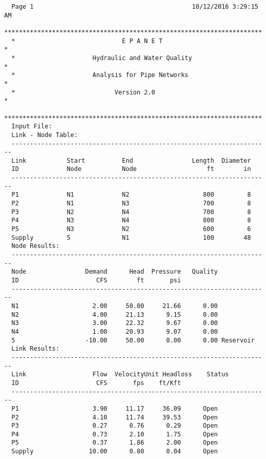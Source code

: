 \documentclass[12pt]{article}
\begin{document}
\begin{verbatim}
  Page 1                                           10/12/2016 3:29:15 AM
  **********************************************************************
  *                             E P A N E T                            *
  *                     Hydraulic and Water Quality                    *
  *                     Analysis for Pipe Networks                     *
  *                           Version 2.0                              *
  **********************************************************************
  Input File: 
  Link - Node Table:
  ----------------------------------------------------------------------
  Link           Start          End                Length  Diameter
  ID             Node           Node                   ft        in
  ----------------------------------------------------------------------
  P1             N1             N2                    800         8
  P2             N1             N3                    700         8
  P3             N2             N4                    700         8
  P4             N3             N4                    800         8
  P5             N3             N2                    600         6
  Supply         5              N1                    100        48
  Node Results:
  ----------------------------------------------------------------------
  Node                Demand      Head  Pressure   Quality
  ID                     CFS        ft       psi          
  ----------------------------------------------------------------------
  N1                    2.00     50.00     21.66      0.00
  N2                    4.00     21.13      9.15      0.00
  N3                    3.00     22.32      9.67      0.00
  N4                    1.00     20.93      9.07      0.00
  5                   -10.00     50.00      0.00      0.00 Reservoir
  Link Results:
  ----------------------------------------------------------------------
  Link                  Flow  VelocityUnit Headloss    Status
  ID                     CFS       fps    ft/Kft
  ----------------------------------------------------------------------
  P1                    3.90     11.17     36.09      Open
  P2                    4.10     11.74     39.53      Open
  P3                    0.27      0.76      0.29      Open
  P4                    0.73      2.10      1.75      Open
  P5                    0.37      1.86      2.00      Open
  Supply               10.00      0.80      0.04      Open
\end{verbatim}
\end{document}
